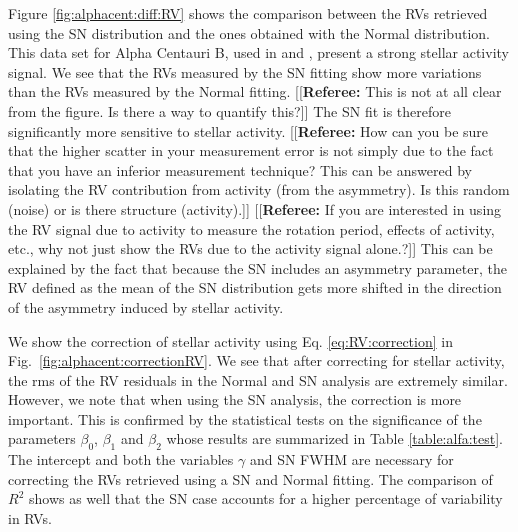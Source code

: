 \documentclass[11pt, oneside]{article}
\newcommand{\comment}[1]{{\color{red}[[\textbf{Referee: }#1]]}}
\begin{document}
Figure \ref{fig:alphacent:diff:RV} shows the comparison between the RVs retrieved using the SN distribution and the ones obtained with the Normal distribution. This data set for Alpha Centauri B, used in \citet{Dumusque-2012} and \citet{Thompson-2017}, present a strong stellar activity signal. We see that the RVs measured by the SN fitting show more variations than the RVs measured by the Normal fitting. 
\comment{This is not at all clear from the figure. Is there a way to quantify this?}
The SN fit is therefore significantly more sensitive to stellar activity. 
\comment{How can you be sure that the higher scatter in your measurement error is not simply due to the fact that you have an inferior measurement technique? This can be answered by isolating the RV contribution from activity (from the asymmetry). Is this random (noise) or is there structure (activity).}
\comment{If you are interested in using the RV signal due to activity to measure the rotation period, effects of activity, etc., why not just show the RVs due to the activity signal alone.?}
This can be explained by the fact that because the SN includes an asymmetry parameter, the RV defined as the mean of the SN distribution gets more shifted in the direction of the asymmetry induced by stellar activity.

We show the correction of stellar activity using Eq. \ref{eq:RV:correction} in Fig.~\ref{fig:alphacent:correctionRV}. We see that after correcting for stellar activity, the rms of the RV residuals in the Normal and SN analysis are extremely similar. However, we note that when using the SN analysis, the correction is more important. This is confirmed by the statistical tests on the significance of the parameters $\beta_{0}$, $\beta_{1}$ and $\beta_{2}$ whose results are summarized in Table \ref{table:alfa:test}. The intercept and both the variables $\gamma$ and SN FWHM are necessary for correcting the RVs retrieved using a SN and Normal fitting. The comparison of $R^2$ shows as well that the SN case accounts for a higher percentage of  variability in RVs. 
\end{document}
